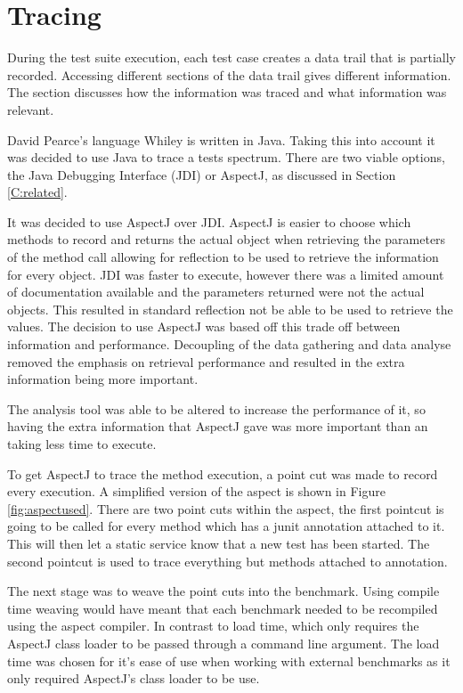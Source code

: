 \section{Tracing}
\label{S:trace}
During the test suite execution, each test case creates a data trail that is partially recorded. Accessing different sections of the data trail gives different information. The section discusses how the information was traced and what information was relevant.

David Pearce's language Whiley is written in Java. Taking this into account it was decided to use Java to trace a tests spectrum. There are two viable options, the Java Debugging Interface (JDI) or AspectJ, as discussed in Section \ref{C:related}. 

It was decided to use AspectJ over JDI. AspectJ is easier to choose which methods to record and returns the actual object when retrieving the parameters of the method call allowing for reflection to be used to retrieve the information for every object. JDI was faster to execute, however there was a limited amount of documentation available and the parameters returned were not the actual objects. This resulted in standard reflection not be able to be used to retrieve the values. The decision to use AspectJ was based off this trade off between information and performance. Decoupling of the data gathering and data analyse removed the emphasis on retrieval performance and resulted in the extra information being more important.

The analysis tool was able to be altered to increase the performance of it, so having the extra information that AspectJ gave was more important than an taking less time to execute. 

To get AspectJ to trace the method execution, a point cut was made to record every execution. A simplified version of the aspect is shown in Figure \ref{fig:aspectused}. There are two point cuts within the aspect, the first pointcut is going to be called for every method which has a junit \@Test annotation attached to it. This will then let a static service know that a new test has been started. The second pointcut is used to trace everything but methods attached to \@Test annotation. 

The next stage was to weave the point cuts into the benchmark. Using compile time weaving would have meant that each benchmark needed to be recompiled using the aspect compiler. In contrast to load time, which only requires the AspectJ class loader to be passed through a command line argument. The load time was chosen for it's ease of use when working with external benchmarks as it only required AspectJ's class loader to be use.

